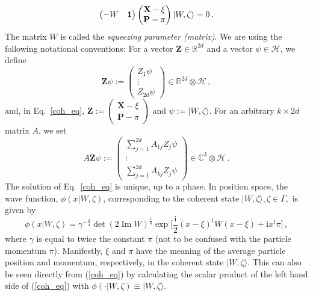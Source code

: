 \documentclass[12pt]{article}
\renewcommand{\Im}{\operatorname{Im}}
\newcommand{\iu}{{\mathrm i}}
\newcommand{\id}{\mathrm{id}}
\begin{document}
\begin{equation}\label{coh_eq}
\begin{pmatrix}
-W & {\bf{1}} \end{pmatrix}
\begin{pmatrix}
\mathbf{X}  -\xi \\
\mathbf{P}  -\pi \end{pmatrix} \vert W, \zeta \rangle = 0\,.
\end{equation}
The matrix $W$ is called the \textit{squeezing parameter (matrix)}. We are using the following notational conventions: For a vector $\mathbf{Z} \in \mathbb{R}^{2d}$ and a vector $\psi \in \mathcal{H}$, we
define 
$$\mathbf{Z} \psi:= \begin{pmatrix} Z_1 \psi \\ \vdots \\ Z_{2d} \psi \end{pmatrix} \in \mathbb{R}^{2d} \otimes \mathcal{H}\,,$$
and, in Eq.~\eqref{coh_eq}, $\mathbf{Z} := \begin{pmatrix} \mathbf{X}-\xi \\ \mathbf{P}- \pi \end{pmatrix}$ and 
$\psi:= \vert W, \zeta\rangle$. For an arbitrary $k\times 2d$ matrix $A$, we set
$$A \mathbf{Z} \psi:= \begin{pmatrix} \sum_{j=1}^{2d} A_{1j} Z_j \psi \\ \vdots \\ \sum_{j=1}^{2d} A_{kj} Z_j \psi \end{pmatrix} \in \mathbb{C}^{k} \otimes \mathcal{H}\,.$$
The solution of Eq.~\eqref{coh_eq} is unique, up to a phase. In position space, the wave function, $\phi(x \vert W, \zeta)$, corresponding to the coherent state $\vert W, \zeta \rangle, \zeta \in \Gamma,$ is given by
\begin{equation}\label{S_repr}
\phi(x \vert W, \zeta) = \gamma^{-\frac d4}\det(2\Im W)^{\frac{1}{4}} \exp\big[ \frac{\iu}{2} (x - \xi)^t W (x - \xi) + \iu x^t \pi\big]\,,
\end{equation}
where $\gamma$ is equal to twice the constant $\pi$ (not to be confused with the particle momentum $\pi$). Manifestly, 
$\xi$ and $\pi$ have the meaning of the average particle position and momentum, respectively, in the coherent state 
$\vert W, \zeta \rangle$. This can also be seen directly from (\ref{coh_eq}) by calculating the scalar product of the 
left hand side of (\ref{coh_eq}) with $\phi(\cdot \vert W, \zeta)\equiv \vert W, \zeta \rangle$.
\end{document}
